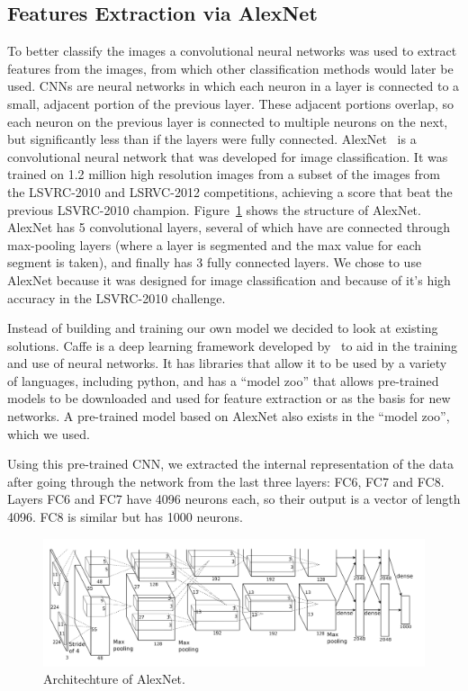 \documentclass{article} %
\begin{document}
 
\subsection{Features Extraction via AlexNet}

To better classify the images a convolutional neural networks was used to extract features from the images, from which other classification methods would later be used. CNNs are neural networks in which each neuron in a layer is connected to a small, adjacent portion of the previous layer. These adjacent portions overlap, so each neuron on the previous layer is connected to multiple neurons on the next, but significantly less than if the layers were fully connected. AlexNet~\citet{krizhevsky2012imagenet} is a convolutional neural network that was developed for image classification. It was trained on 1.2 million high resolution images from a subset of the images from the LSVRC-2010 and LSRVC-2012 competitions, achieving a score that beat the previous LSVRC-2010 champion. Figure~\ref{fig:alexnet} shows the structure of AlexNet. AlexNet has 5 convolutional layers, several of which have are connected through max-pooling layers (where a layer is segmented and the max value for each segment is taken), and finally has 3 fully connected layers. We chose to use AlexNet because it was designed for image classification and because of it's high accuracy in the LSVRC-2010 challenge.

Instead of building and training our own model we decided to look at existing solutions. Caffe is a deep learning framework developed by~\citet{jia2014caffe} to aid in the training and use of neural networks. It has libraries that allow it to be used by a variety of languages, including python, and has a ``model zoo'' that allows pre-trained models to be downloaded and used for feature extraction or as the basis for new networks. A pre-trained model based on AlexNet also exists in the ``model zoo'', which we used.

Using this pre-trained CNN, we extracted the internal representation of the data after going through the network from the last three layers: FC6, FC7 and FC8. Layers FC6 and FC7 have 4096 neurons each, so their output is a vector of length 4096. FC8 is similar but has 1000 neurons.
\begin{figure}[h]
\centering
\includegraphics[width=\textwidth]{alexnet.png}
\caption{Architechture of AlexNet.}
\label{fig:alexnet}
\end{figure}
\end{document}

